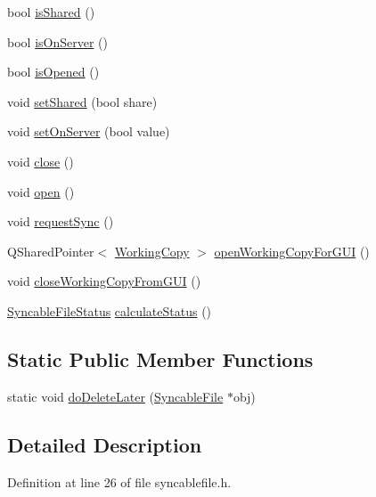 \begin{DoxyCompactItemize}
\item 
bool \hyperlink{class_syncable_file_a131f0d449bd537c81e8923f183cae7e2}{isShared} ()
\item 
bool \hyperlink{class_syncable_file_a1e62d77fcf259e500198f4d77e28d498}{isOnServer} ()
\item 
bool \hyperlink{class_syncable_file_a2702330bcc15c3131455f5392106c088}{isOpened} ()
\item 
void \hyperlink{class_syncable_file_a5f136cb23aaec934c688843a141cba92}{setShared} (bool share)
\item 
void \hyperlink{class_syncable_file_a9e74d9db10a0b3199177509f3ed694ff}{setOnServer} (bool value)
\item 
void \hyperlink{class_syncable_file_a2c342b508a96733102f96e38cb289889}{close} ()
\item 
void \hyperlink{class_syncable_file_a4e98844d45ce336813d2d7dc879c3f72}{open} ()
\item 
void \hyperlink{class_syncable_file_ab3ef540a235ffc7c479f07ad0b14f722}{requestSync} ()
\item 
QSharedPointer$<$ \hyperlink{class_working_copy}{WorkingCopy} $>$ \hyperlink{class_syncable_file_ab3dd03418165cb9dcaa5b8e831844d92}{openWorkingCopyForGUI} ()
\item 
void \hyperlink{class_syncable_file_a4255c08954993cd032fb775a2b884199}{closeWorkingCopyFromGUI} ()
\item 
\hyperlink{syncablefile_8h_a9c6830313033d89085f8e1389f01060d}{SyncableFileStatus} \hyperlink{class_syncable_file_aa1cca0675140234f5c68bd797abe2429}{calculateStatus} ()
\end{DoxyCompactItemize}
\subsection*{Static Public Member Functions}
\begin{DoxyCompactItemize}
\item 
static void \hyperlink{class_syncable_file_ae522f2ddafedca2b67d5883c3530293d}{doDeleteLater} (\hyperlink{class_syncable_file}{SyncableFile} $\ast$obj)
\end{DoxyCompactItemize}


\subsection{Detailed Description}


Definition at line 26 of file syncablefile.h.



